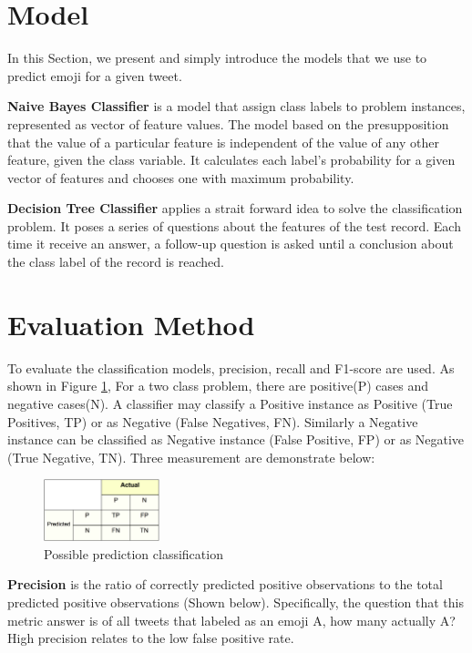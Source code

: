\documentclass[11pt]{article}
\begin{document}
\section{Model}

In this Section, we present and simply introduce the models that we use to predict emoji for a  given tweet.

\noindent\textbf{Naive Bayes Classifier} is a model that assign class labels to problem instances, represented as vector of feature values. The model based on the presupposition that the value of a particular feature is independent of the value of any other feature, given the class variable. It calculates each label's probability for a given vector of features and chooses one with maximum probability.

\noindent\textbf{Decision Tree Classifier} applies a strait forward idea to solve the classification problem. It poses a series of questions about the features of the test record. Each time it receive an answer, a follow-up question is asked until a conclusion about the class label of the record is reached.


\section{Evaluation Method}

To evaluate the classification models, precision, recall and F1-score are used. As shown in Figure \ref{fig:1}, For a two class problem, there are positive(P) cases and negative cases(N). A classifier may classify a Positive instance as Positive (True Positives, TP) or as Negative (False Negatives, FN). Similarly a Negative instance can be classified as Negative instance (False Positive, FP) or as Negative (True Negative, TN).  Three measurement are demonstrate below: 

\begin{figure}[h]
	\centering
	\includegraphics[width=0.3\textwidth]{img/img1}
	\caption{Possible prediction classification}
	\label{fig:1}
\end{figure}

\noindent\textbf{Precision} is the ratio of correctly predicted positive observations to the total predicted positive observations (Shown below). Specifically, the question that this metric answer is of all tweets that labeled as an emoji A, how many actually A? High precision relates to the low false positive rate.
\end{document}
